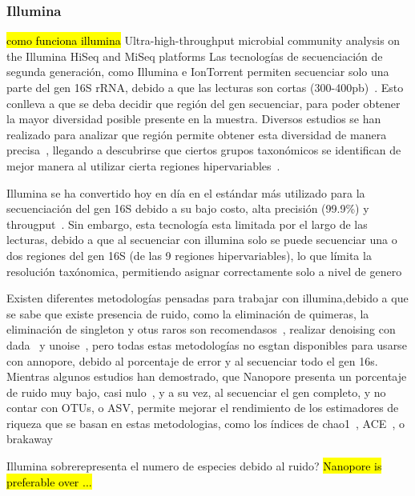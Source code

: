 \subsubsection{Illumina}
\hl{como funciona illumina}
Ultra-high-throughput microbial community analysis on the Illumina HiSeq and MiSeq platforms
Las tecnologías de secuenciación de segunda generación, como Illumina e IonTorrent permiten secuenciar solo una parte del gen 16S rRNA, debido a que las lecturas son cortas (300-400pb)~\cite{salipante2014performance}. Esto conlleva a que se deba decidir que región del gen secuenciar, para poder obtener la mayor diversidad posible presente en la muestra. Diversos estudios se han realizado para analizar que región permite obtener esta diversidad de manera precisa~\cite{liu2008accurate,schloss2011reducing}, llegando a descubrirse que ciertos grupos taxonómicos se identifican de mejor manera al utilizar cierta regiones hipervariables~\cite{he2013comparison,claesson2010comparison}.

Illumina se ha convertido hoy en día en el estándar más utilizado para la secuenciación del gen 16S debido a su bajo costo, alta precisión (99.9\%) y througput~\cite{pichler201816s}. Sin embargo, esta tecnología esta limitada por el largo de las lecturas, debido a que al secuenciar con illumina solo se puede secuenciar una o dos regiones del gen 16S (de las 9 regiones hipervariables), lo que límita la resolución taxónomica, permitiendo asignar correctamente solo a nivel de genero~\cite{johnson2019evaluation}

Existen diferentes metodologías pensadas para trabajar con illumina,debido a que se sabe que existe presencia de ruido, como la eliminación de quimeras, la eliminación de singleton y otus raros son recomendasos~\cite{caporaso2011global,auer2017analysis}, realizar denoising con dada~\cite{callahan2016dada2} y unoise~\cite{edgar2016unoise2}, pero todas estas metodologías no esgtan disponibles para usarse con annopore, debido al porcentaje de error y al secuenciar todo el gen 16s.
Mientras algunos estudios han demostrado, que Nanopore presenta un porcentaje de ruido muy bajo, casi nulo~\cite{szoboszlay2023nanopore}, y a su vez, al secuenciar el gen completo, y no contar con OTUs, o ASV, permite mejorar el rendimiento de los estimadores de riqueza que se basan en estas metodologias, como los índices de chao1~\cite{chao1984nonparametric}, ACE~\cite{chao1992estimating}, o brakaway~\cite{willis2015estimating}


Illumina sobrerepresenta el numero de especies debido al ruido? \hl{Nanopore is preferable over ...}


